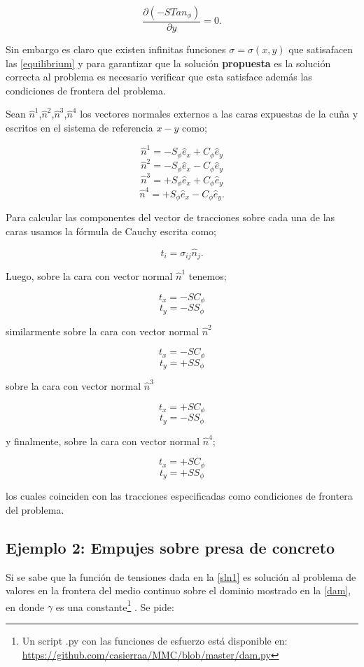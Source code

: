 \documentclass[../notas medios.tex]{subfiles}
\begin{document}
\[\frac{{\partial ( - STa{n_\phi })}}{{\partial y}} = 0.\]


Sin embargo es claro que existen infinitas funciones $\sigma  = \sigma (x,y)$  que satisafacen las \cref{equilibrium} y para garantizar que la solución {\bf propuesta} es la solución correcta al problema es necesario verificar que esta satisface además las condiciones de frontera del problema.

Sean $\hat{n}^1$,$\hat{n}^2$,$\hat{n}^3$,$\hat{n}^4$ los vectores normales externos a las caras expuestas de la cuña y escritos en el sistema de referencia $x-y$ como;

\[\hat{n}^1=-S_{\phi}\hat{e}_{x}+C_{\phi}\hat{e}_{y}\]
\[\hat{n}^2=-S_{\phi}\hat{e}_{x}-C_{\phi}\hat{e}_{y}\]
\[\hat{n}^3=+S_{\phi}\hat{e}_{x}+C_{\phi}\hat{e}_{y}\]
\[\hat{n}^4=+S_{\phi}\hat{e}_{x}-C_{\phi}\hat{e}_{y}.\]


Para calcular las componentes del vector de tracciones sobre cada una de las caras usamos la fórmula de Cauchy escrita como;

\[t_{i}=\sigma_{ij}\hat{n}_{j}.\]

Luego, sobre la cara con vector normal $\hat{n}^1$ tenemos;

\[t_{x}=-SC_{\phi}\]
\[t_{y}=-SS_{\phi}\]

similarmente sobre la cara con vector normal $\hat{n}^2$

\[t_{x}=-SC_{\phi}\]
\[t_{y}=+SS_{\phi}\]

sobre la cara con vector normal $\hat{n}^3$ 

\[t_{x}=+SC_{\phi}\]
\[t_{y}=-SS_{\phi}\]

y finalmente, sobre la cara con vector normal $\hat{n}^4$;

\[t_{x}=+SC_{\phi}\]
\[t_{y}=+SS_{\phi}\]

los cuales coinciden con las tracciones especificadas como condiciones de frontera del problema.


\subsection*{Ejemplo 2: Empujes sobre presa de concreto}

Si se sabe que la función de tensiones dada en la \cref{sln1} es solución al problema de valores en la frontera del medio continuo sobre el dominio mostrado en la \cref{dam}, en donde $\gamma$ es una constante\footnote{Un script .py con las funciones de esfuerzo está disponible en:  {\url{https://github.com/casierraa/MMC/blob/master/dam.py}}} . Se pide: 
\end{document}
